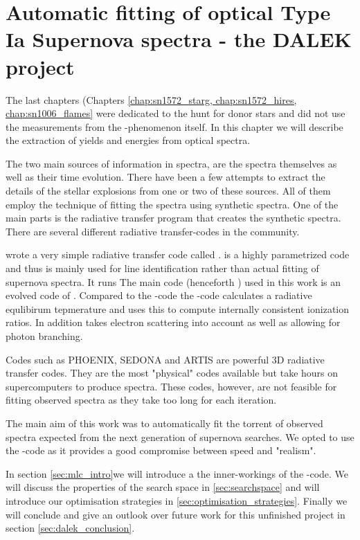 \chapter{Automatic fitting of optical Type Ia Supernova spectra - the DALEK project}
\label{chap:dalek}

The last chapters (Chapters \ref{chap:sn1572_starg, chap:sn1572_hires, chap:sn1006_flames} were dedicated to the hunt for donor stars and did not use the measurements from the \snia-phenomenon itself. In this chapter we will describe the extraction of yields and energies from optical spectra. 

The two main sources of information in spectra, are the spectra themselves as well as their time evolution. There have been a few attempts to extract the details of the stellar explosions from one or two of these sources. All of them employ the technique of fitting the spectra using synthetic spectra. One of the main parts is the radiative transfer program that creates the synthetic spectra. There are several different radiative transfer-codes in the community. 


\cite{2000PhDT.........6F} wrote a very simple radiative transfer code called \synow. \synow is a highly parametrized code and thus is mainly used for line identification rather than actual fitting of supernova spectra. It runs 
The main code (henceforth \mlc) used in this work is an evolved code of  \cite{1993A&A...279..447M, 2000A&A...363..705M}. Compared to the \synow-code the \mlc-code calculates a radiative equlibirum tepmerature and uses this to compute internally consistent ionization ratios. In addition \mlc takes electron scattering into account as well as allowing for photon branching. 


Codes such as PHOENIX\cite{1999JCoAM.109...41H}, SEDONA \cite{2006ApJ...651..366K} and ARTIS \cite{2009MNRAS.398.1809K} are powerful 3D radiative transfer codes. They are the most "physical" codes available but take hours on supercomputers to produce spectra. These codes, however, are not feasible for fitting observed spectra as they take too long for each iteration. 

The main aim of this work was to automatically fit the torrent of observed spectra expected from the next generation of supernova searches. We opted to use the \mlc-code  as it provides a good compromise between speed and "realism".

In section \ref{sec:mlc_intro}we will introduce a the inner-workings of the \mlc-code.  We will discuss the properties of the search space in \ref{sec:searchspace} and will introduce our optimisation strategies in \ref{sec:optimisation_strategies}. Finally we will conclude and give an outlook over future work for this unfinished project in section \ref{sec:dalek_conclusion}.

